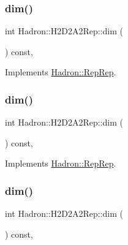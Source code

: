 \subsubsection{\texorpdfstring{dim()}{dim()}\hspace{0.1cm}{\footnotesize\ttfamily [3/5]}}
{\footnotesize\ttfamily int Hadron\+::\+H2\+D2\+A2\+Rep\+::dim (\begin{DoxyParamCaption}{ }\end{DoxyParamCaption}) const\hspace{0.3cm}{\ttfamily [inline]}, {\ttfamily [virtual]}}



Implements \mbox{\hyperlink{structHadron_1_1RepRep_a92c8802e5ed7afd7da43ccfd5b7cd92b}{Hadron\+::\+Rep\+Rep}}.

\mbox{\label{structHadron_1_1H2D2A2Rep_aca0f53f952eae12ac23f9cc429108dcc}} 
\subsubsection{\texorpdfstring{dim()}{dim()}\hspace{0.1cm}{\footnotesize\ttfamily [4/5]}}
{\footnotesize\ttfamily int Hadron\+::\+H2\+D2\+A2\+Rep\+::dim (\begin{DoxyParamCaption}{ }\end{DoxyParamCaption}) const\hspace{0.3cm}{\ttfamily [inline]}, {\ttfamily [virtual]}}



Implements \mbox{\hyperlink{structHadron_1_1RepRep_a92c8802e5ed7afd7da43ccfd5b7cd92b}{Hadron\+::\+Rep\+Rep}}.

\mbox{\label{structHadron_1_1H2D2A2Rep_aca0f53f952eae12ac23f9cc429108dcc}} 
\subsubsection{\texorpdfstring{dim()}{dim()}\hspace{0.1cm}{\footnotesize\ttfamily [5/5]}}
{\footnotesize\ttfamily int Hadron\+::\+H2\+D2\+A2\+Rep\+::dim (\begin{DoxyParamCaption}{ }\end{DoxyParamCaption}) const\hspace{0.3cm}{\ttfamily [inline]}, {\ttfamily [virtual]}}



